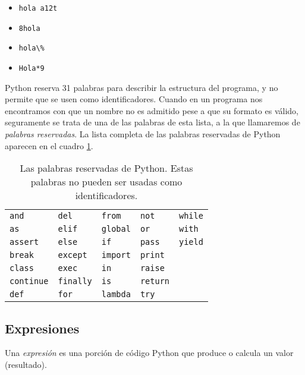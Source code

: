 \begin{itemize}
\item \lstinline!hola a12t!
\item \lstinline!8hola!
\item \lstinline!hola\%!
\item \lstinline!Hola*9!
\end{itemize}

Python reserva 31 palabras para describir la estructura del
programa, y no permite que se usen como identificadores. Cuando en
un programa nos encontramos con que un nombre no es admitido pese
a que su formato es válido, seguramente se trata de una de las
palabras de esta lista, a la que llamaremos de {\it palabras
reservadas}. La lista completa de las palabras reservadas de
Python aparecen en el cuadro \ref{kw}.

\begin{table}[h]
\begin{tabular}[l]{l l l l l}

\lstinline!and! & \lstinline!del! & \lstinline!from! & \lstinline!not! & \lstinline!while! \\
\lstinline!as! & \lstinline!elif! & \lstinline!global! & \lstinline!or! & \lstinline!with! \\
\lstinline!assert! & \lstinline!else! & \lstinline!if! & \lstinline!pass! & \lstinline!yield! \\
 \lstinline!break! & \lstinline!except! & \lstinline!import! & \lstinline!print! \\
\lstinline!class! & \lstinline!exec! & \lstinline!in! & \lstinline!raise! \\
\lstinline!continue! & \lstinline!finally! & \lstinline!is! & \lstinline!return! \\
 \lstinline!def! & \lstinline!for! & \lstinline!lambda! & \lstinline!try! \\
\end{tabular}

\vspace{.5cm} \caption{Las palabras reservadas de Python. Estas
palabras no pueden ser usadas como identificadores.}\label{kw}
\end{table}

\subsection{Expresiones}
Una {\it expresión} es una porción de código Python que produce o
calcula un valor (resultado).

